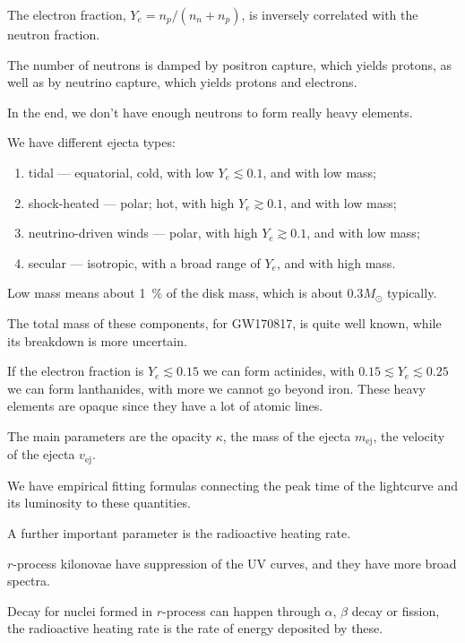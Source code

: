 \documentclass[main.tex]{subfiles}
\begin{document}
The electron fraction, \(Y_e = n_p / (n_n + n_p)\), is inversely correlated 
with the neutron fraction. 

The number of neutrons is damped by positron capture, which yields protons,
as well as by neutrino capture, which yields protons and electrons. 

In the end, we don't have enough neutrons to form really heavy elements. 

We have different ejecta types: 
\begin{enumerate}
    \item tidal --- equatorial, cold, with low \(Y_e \lesssim 0.1\), and with low mass;
    \item shock-heated --- polar; hot, with high  \(Y_e \gtrsim 0.1\), and with low mass;
    \item neutrino-driven winds --- polar, with high \(Y_e \gtrsim 0.1\), and with low mass;
    \item secular --- isotropic, with a broad range of \(Y_e\), and with high mass.
\end{enumerate}

Low mass means about \SI{1}{\percent} of the disk mass, which is about \(0.3 M_{\odot}\) 
typically.

The total mass of these components, for GW170817, is quite well known, 
while its breakdown is more uncertain. 

If the electron fraction is \(Y_e \lesssim 0.15\) we can form actinides, 
with \(0.15 \lesssim Y_e \lesssim 0.25\) we can form lanthanides, 
with more we cannot go beyond iron. 
These heavy elements are opaque since they have a lot of atomic lines. 

The main parameters are the opacity \(\kappa \), the mass of the ejecta \(m _{\text{ej}}\),
the velocity of the ejecta \(v _{\text{ej}}\). 

We have empirical fitting formulas connecting the peak time of the 
lightcurve and its luminosity to these quantities. 


A further important parameter is the radioactive heating rate. 

\(r\)-process kilonovae have suppression of the UV curves, 
and they have more broad spectra. 

Decay for nuclei formed in \(r\)-process can happen through \(\alpha \), \(\beta \) decay or fission,
the radioactive heating rate is the rate of energy deposited by these. 
\end{document}

